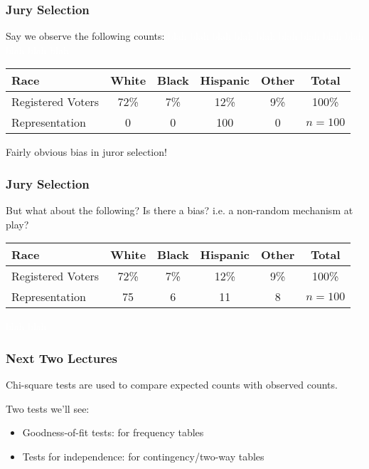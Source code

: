 \documentclass[handout]{beamer}
\newcommand{\blue}[1]{\textcolor{blue2}{#1}}
\newcommand{\white}[1]{\textcolor{white}{#1}}
\begin{document}
\begin{frame}[fragile]
\frametitle{Jury Selection}
Say we \blue{observe} the following counts: \white{blah blah blah blah blah blah blah blah blah blah blah blah}

\begin{center}
\begin{tabular}{l||cccc|c}
Race & White & Black & Hispanic & Other & Total \\ 
\hline
Registered Voters & 72\% & 7\% & 12\% & 9\% & 100\%\\ 
Representation & 0 & 0 & 100 & 0 & $n=100$ \\ 
\end{tabular}
\end{center}

\pause Fairly obvious bias in juror selection!

\end{frame}


\begin{frame}[fragile]
\frametitle{Jury Selection}
But what about the following?  Is there a bias?  i.e. a non-random mechanism at play?

\begin{center}
\begin{tabular}{l||cccc|c}
Race & White & Black & Hispanic & Other & Total \\ 
\hline
Registered Voters & 72\% & 7\% & 12\% & 9\% & 100\%\\ 
Representation & 75 & 6 & 11 & 8 & $n=100$ \\ 
\end{tabular}
\end{center}

\white{blah blah}

\end{frame}


\begin{frame}[fragile]
\frametitle{Next Two Lectures}

Chi-square tests are used to compare \blue{expected} counts with \blue{observed} counts.

\vspace{0.25cm}

\pause Two tests we'll see:
\begin{itemize}
\item Goodness-of-fit tests:  for frequency tables
\item Tests for independence:  for contingency/two-way tables
\end{itemize}

\end{frame}
\end{document}
